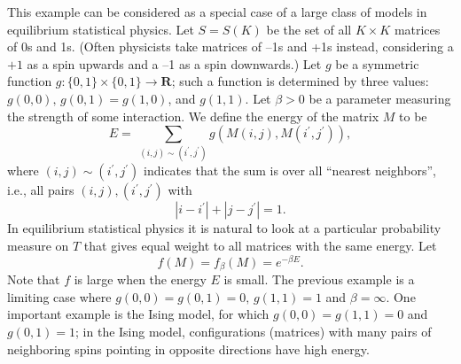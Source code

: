 \documentclass{stml-l}
\theoremstyle{definition}
\numberwithin{equation}{chapter}
\numberwithin{figure}{chapter}
\numberwithin{figure}{section}
\begin{document}
This example can be considered as a special case of a large class of
models in equilibrium statistical physics. Let $S=S(K)$ be the set
of all $K\times K$ matrices of 0s and 1s. (Often physicists take
matrices of --1s and +1s instead, considering a $+1$ as a spin
upwards and a --1 as a spin downwards.) Let $g$ be a symmetric
function $ g:\{0,1\}\times \{0,1\}\rightarrow \mathbf{R}$; such a
function is determined by three values: $g(0,0),\,g(0,1)=g(1,0)$, and
$g(1,1)$. Let $\beta>0$ be a parameter measuring the strength of
some interaction. We define the energy of the matrix $M$ to be
\begin{equation*}
E=\ \sum_{(i,j)\sim(i^{\prime},j^{\prime})}
g(M(i,j),M(i^{\prime},j^{\prime})),
\end{equation*}
where $(i,j)\sim(i^{\prime},j^{\prime})$ indicates that the sum is
over all ``nearest neighbors'', i.e., all pairs
$(i,j),(i^{\prime},j^{\prime})$ with
\begin{equation*}
|i-i^{\prime}|+|j-j^{\prime}|=1.
\end{equation*}
In equilibrium statistical physics it is natural to look at a
particular probability measure on $T$ that gives equal weight to all
matrices with the same energy. Let
\begin{equation*}
f(M)=f_{\beta}(M)=e^{-\beta E}.
\end{equation*}
Note that $f$ is large when the energy $E$ is small. The previous
example is a limiting case where $g(0,0)=g(0,1)=0,\,g(1,1)=1$ and
$\beta=\infty$. One important example is the Ising model, for which
$g(0,0)=g(1,1)=0$ and $g(0,1)=1$; in the Ising model, configurations
(matrices) with many pairs of neighboring spins pointing in opposite
directions have high energy.
\end{document}
